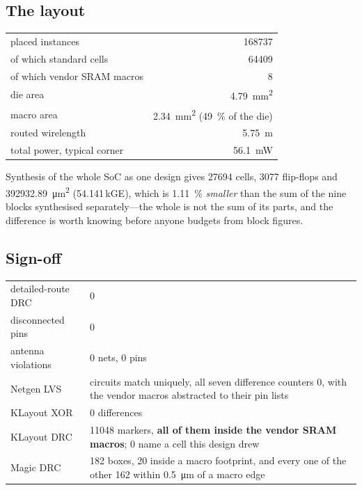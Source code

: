 \documentclass[11pt,a4paper]{article}
\begin{document}
\subsection{The layout}

\begin{center}
\begin{tabular}{lr}
\toprule
placed instances & \num{168737} \\
\quad of which standard cells & \num{64409} \\
\quad of which vendor SRAM macros & \num{8} \\
die area & \SI{4.79}{\milli\meter\squared} \\
macro area & \SI{2.34}{\milli\meter\squared} (\SI{49}{\percent} of the die) \\
routed wirelength & \SI{5.75}{\meter} \\
total power, typical corner & \SI{56.1}{\milli\watt} \\
\bottomrule
\end{tabular}
\end{center}

Synthesis of the whole SoC as one design gives \num{27694} cells,
\num{3077} flip-flops and \SI{392932.89}{\micro\meter\squared}
(\num{54.141}\,kGE), which is \SI{1.11}{\percent} \emph{smaller} than the
sum of the nine blocks synthesised separately---the whole is not the sum
of its parts, and the difference is worth knowing before anyone budgets
from block figures.

\subsection{Sign-off}

\begin{center}
\begin{tabular}{lL{8.4cm}}
\toprule
detailed-route DRC & \num{0} \\
disconnected pins & \num{0} \\
antenna violations & \num{0} nets, \num{0} pins \\
Netgen LVS & circuits match uniquely, all seven difference counters
  \num{0}, with the vendor macros abstracted to their pin lists \\
KLayout XOR & \num{0} differences \\
KLayout DRC & \num{11048} markers, \textbf{all of them inside the vendor
  SRAM macros}; \num{0} name a cell this design drew \\
Magic DRC & \num{182} boxes, \num{20} inside a macro footprint, and every
  one of the other \num{162} within \SI{0.5}{\micro\meter} of a macro
  edge \\
\bottomrule
\end{tabular}
\end{center}
\end{document}
